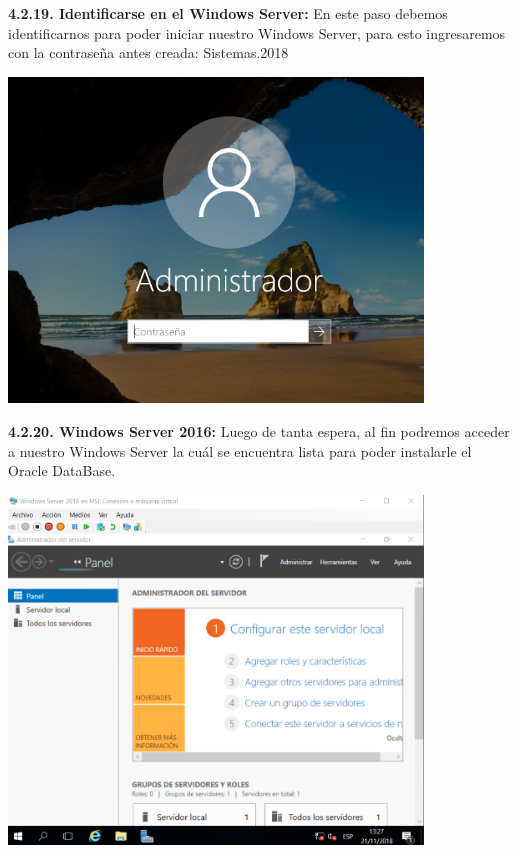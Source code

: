 \textbf {4.2.19. Identificarse en el Windows Server:} En este paso debemos identificarnos para poder iniciar nuestro Windows Server, para esto ingresaremos con la contraseña antes creada: Sistemas.2018
\begin{center}
  \includegraphics[width=11cm]{Imagenes/Identificarse.png}
\end{center}

\textbf {4.2.20. Windows Server 2016:} Luego de tanta espera, al fin podremos acceder a nuestro Windows Server la cuál se encuentra lista para poder instalarle el Oracle DataBase.
\begin{center}
  \includegraphics[width=11cm]{Imagenes/Escritorio_Windows_Server.png}
\end{center}
\break